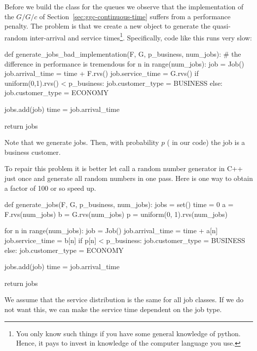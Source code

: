 Before we build the class for the queues we observe that the implementation of the $G/G/c$ of Section~\ref{sec:ggc-continuous-time} suffers from a performance penalty. The problem is that  we create a new object to generate the quasi-random inter-arrival and service times\footnote{You only know such things if you have some general knowledge of python. Hence, it pays to invest in knowledge of the computer language you use.}. Specifically,  code like this runs very slow:
\begin{pyverbatim}
def generate_jobs_bad_implementation(F, G, p_business, num_jobs):
    # the difference in performance is tremendous
    for n in range(num_jobs):
        job = Job()
        job.arrival_time = time + F.rvs()  
        job.service_time = G.rvs()  
        if uniform(0,1).rvs() < p_business:
            job.customer_type = BUSINESS
        else:
            job.customer_type = ECONOMY

        jobs.add(job)
        time = job.arrival_time

    return jobs
\end{pyverbatim}
Note that we generate  jobs. Then, with probability $p$ ( in our code) the job is a business customer. 

To repair this problem it is better let  call a random number generator in C++ just once and generate all random numbers in one pass.
Here is one way to obtain a factor of 100 or so speed up.
\begin{pyverbatim}
def generate_jobs(F, G, p_business, num_jobs):
    jobs = set()
    time = 0
    a = F.rvs(num_jobs)
    b = G.rvs(num_jobs)
    p = uniform(0, 1).rvs(num_jobs)

    for n in range(num_jobs):
        job = Job()
        job.arrival_time = time + a[n]
        job.service_time = b[n]
        if p[n] <  p_business:
            job.customer_type = BUSINESS
        else:
            job.customer_type = ECONOMY

        jobs.add(job)
        time = job.arrival_time

    return jobs
\end{pyverbatim}

We assume that the service distribution is the same for all job classes. If we do not want this, we can make the service time dependent on the job type. 

